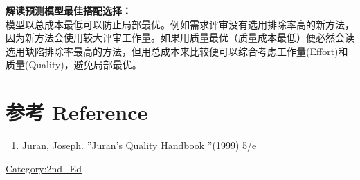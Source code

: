 \documentclass{book}        %
\providecommand{\tightlist}{%
  \setlength{\itemsep}{0pt}\setlength{\parskip}{0pt}}
\begin{document}
\textbf{解读预测模型最佳搭配选择：}\\
模型以总成本最低可以防止局部最优。例如需求评审没有选用排除率高的新方法，因为新方法会使用较大评审工作量。如果用质量最优（质量成本最低）便必然会读选用缺陷排除率最高的方法，但用总成本来比较便可以综合考虑工作量(Effort)和质量(Quality)，避免局部最优。\\

\hypertarget{ux53c2ux8003-reference}{%
\section{参考 Reference}\label{ux53c2ux8003-reference}}

\begin{enumerate}
\tightlist
\item
  Juran, Joseph. ''Juran's Quality Handbook ''(1999) 5/e\\
\end{enumerate}

\begin{description}
\item[]
\end{description}

\url{Category:2nd_Ed}
\end{document}
